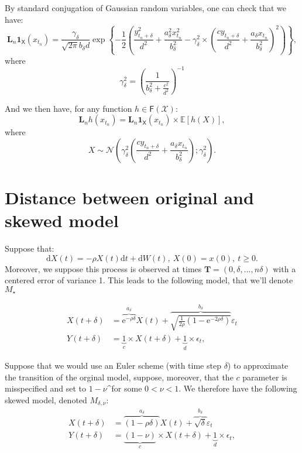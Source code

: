 \documentclass[]{article}
\begin{document}
By standard conjugation of Gaussian random variables, one can check that
we have:
\[\mathbf{L}_n\mathbf{1}_\mathsf{X}(x_{t_n}) = \frac{\gamma_\delta}{\sqrt{2 \pi}b_\delta d}\exp\left\lbrace -\frac{1}{2}\left(\frac{y^2_{t_n + \delta}}{d^2} + \frac{a_\delta^2x_{t_n}^2}{b_\delta^2}  - \gamma_\delta^2\times \left(\frac{c y_{t_n + \delta}}{d^2} + \frac{a_\delta x_{t_n}}{b_\delta^2} \right)^2 \right)   \right\rbrace, \]
where
\[\gamma^2_\delta = \left(\frac{1}{b_\delta^2 + \frac{c^2}{d^2}} \right)^{-1}\]

And we then have, for any function \(h \in \mathsf{F}(\mathcal{X})\):
\[\mathbf{L}_n h (x_{t_n}) = \mathbf{L}_n\mathbf{1}_\mathsf{X}(x_{t_n}) \times \mathbb{E}\left[h(X)\right],\]
where
\[X \sim \mathcal{N}\left(\gamma^2_\delta \left(\frac{c y_{t_n + \delta}}{d^2} + \frac{a_\delta x_{t_n}}{b_\delta^2} \right); \gamma_\delta^2\right).\]

\hypertarget{distance-between-original-and-skewed-model}{%
\section{Distance between original and skewed
model}\label{distance-between-original-and-skewed-model}}

Suppose that: \[
\text{d} X(t) = -\rho X(t) \text{d}t + \text{d}W(t),~X(0) = x(0),~t\geq 0.
\] Moreover, we suppose this process is observed at times
\(\mathbf{T} = (0, \delta, \dots, n\delta)\) with a centered error of
variance 1. This leads to the following model, that we'll denote
\(M_\star\)

\begin{align}
X(t + \delta) &=  \overbrace{\text{e}^{-\rho\delta}}^{a_\delta} X(t) + \overbrace{\sqrt{\frac{1}{2\rho}\left(1 - \text{e}^{-2\rho\delta}\right)}}^{b_\delta} \varepsilon_t \\
Y(t + \delta) &= \underbrace{1}_c \times X(t + \delta) + \underbrace{1}_d \times \epsilon_t,
\end{align}

Suppose that we would use an Euler scheme (with time step \(\delta\)) to
approximate the transition of the orginal model, suppose, moreover, that
the \(c\) parameter is misspecified and set to \(1 -\nu\)\^{}for some
\(0< \nu < 1\). We therefore have the following skewed model, denoted
\(M_{\delta, \nu}\): \begin{align}
X(t + \delta) &=  \overbrace{\left(1 - \rho\delta\right)}^{a_\delta} X(t) + \overbrace{\sqrt{\delta}}^{b_\delta} \varepsilon_t \\
Y(t + \delta) &= \underbrace{\left(1 - \nu\right)}_c \times X(t + \delta) + \underbrace{1}_d \times \epsilon_t,
\end{align}
\end{document}
